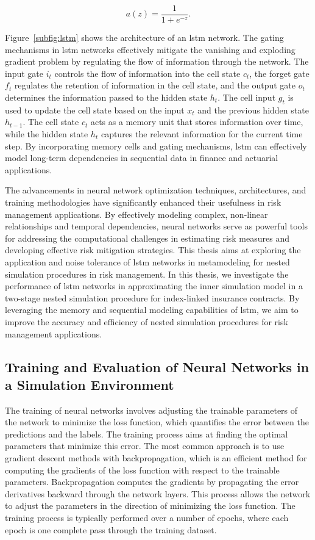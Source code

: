 \begin{equation*}
    a(z) = \frac{1}{1 + e^{-z}}.
\end{equation*}

Figure~\ref{subfig:lstm} shows the architecture of an \gls{lstm} network.
The gating mechanisms in \gls{lstm} networks effectively mitigate the vanishing and exploding gradient problem by regulating the flow of information through the network.
The input gate $i_t$ controls the flow of information into the cell state $c_t$, the forget gate $f_t$ regulates the retention of information in the cell state, and the output gate $o_t$ determines the information passed to the hidden state $h_t$.
The cell input $g_t$ is used to update the cell state based on the input $x_t$ and the previous hidden state $h_{t-1}$.
The cell state $c_t$ acts as a memory unit that stores information over time, while the hidden state $h_t$ captures the relevant information for the current time step.
By incorporating memory cells and gating mechanisms, \gls{lstm} can effectively model long-term dependencies in sequential data in finance and actuarial applications.

The advancements in neural network optimization techniques, architectures, and training methodologies have significantly enhanced their usefulness in risk management applications.
By effectively modeling complex, non-linear relationships and temporal dependencies, neural networks serve as powerful tools for addressing the computational challenges in estimating risk measures and developing effective risk mitigation strategies.
This thesis aims at exploring the application and noise tolerance of \gls{lstm} networks in metamodeling for nested simulation procedures in risk management.
In this thesis, we investigate the performance of \gls{lstm} networks in approximating the inner simulation model in a two-stage nested simulation procedure for index-linked insurance contracts.
By leveraging the memory and sequential modeling capabilities of \gls{lstm}, we aim to improve the accuracy and efficiency of nested simulation procedures for risk management applications.

\subsection{Training and Evaluation of Neural Networks in a Simulation Environment}

The training of neural networks involves adjusting the trainable parameters of the network to minimize the loss function, which quantifies the error between the predictions and the labels.
The training process aims at finding the optimal parameters that minimize this error.
The most common approach is to use gradient descent methods with backpropagation, which is an efficient method for computing the gradients of the loss function with respect to the trainable parameters.
Backpropagation computes the gradients by propagating the error derivatives backward through the network layers.
This process allows the network to adjust the parameters in the direction of minimizing the loss function.
The training process is typically performed over a number of epochs, where each epoch is one complete pass through the training dataset.

